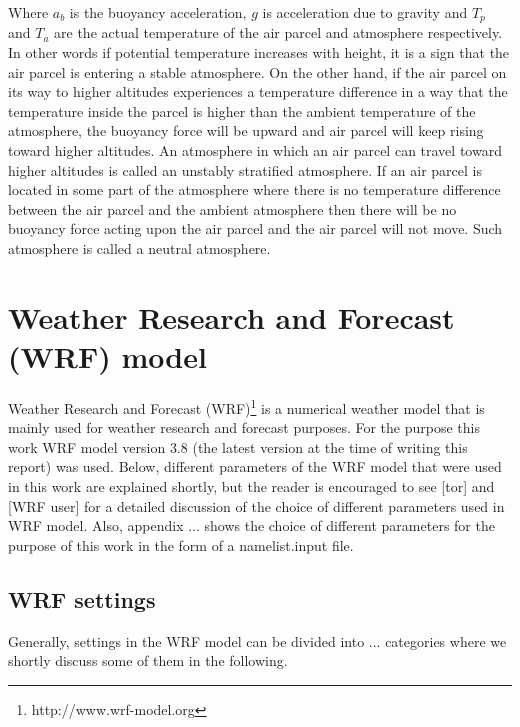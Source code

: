 \documentclass[a4paper,12pt]{article}
\numberwithin{equation}{section} %
\begin{document}
Where $a_b$ is the buoyancy acceleration, $g$ is acceleration due to gravity and $T_p$ and $T_a$ are the actual temperature of the air parcel and atmosphere respectively. In other words if potential temperature increases with height, it is a sign that the air parcel is entering a stable atmosphere. On the other hand, if the air parcel on its way to higher altitudes experiences a temperature difference in a way that the temperature inside the parcel is higher than the ambient temperature of the atmosphere, the buoyancy force will be upward and air parcel will keep rising toward higher altitudes. An atmosphere in which an air parcel can travel toward higher altitudes is called an unstably stratified atmosphere. If an air parcel is located in some part of the atmosphere where there is no temperature difference between the air parcel and the ambient atmosphere then there will be no buoyancy force acting upon the air parcel and the air parcel will not move. Such atmosphere is called a neutral atmosphere.

\newpage

\section{Weather Research and Forecast (WRF) model}

Weather Research and Forecast (WRF)\footnote{http://www.wrf-model.org} is a numerical weather model that is mainly used for weather research and forecast purposes. 
For the purpose this work WRF model version 3.8 (the latest version at the time of writing this report) was used. Below, different parameters of the WRF model that were used in this work are explained shortly, but the reader is encouraged to see [tor] and [WRF user] for a detailed discussion of the choice of different parameters used in WRF model. Also, appendix ... shows the choice of different parameters for the purpose of this work in the form of a namelist.input file. 


\subsection{WRF settings}
Generally, settings in the WRF model can be divided into ... categories where we shortly discuss some of them in the following.
\end{document}
